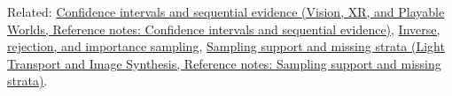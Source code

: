 Related: \href{../07-Vision-XR-and-Playable-Worlds/main.pdf\#nameddest=appendix-c83016554b1e}{Confidence intervals and sequential evidence (Vision, XR, and Playable Worlds, Reference notes: Confidence intervals and sequential evidence)}, \hyperref[appendix-8d863ed954d0]{Inverse, rejection, and importance sampling}, \href{../04-Light-Transport-and-Image-Synthesis/main.pdf\#nameddest=appendix-10308c3d753e}{Sampling support and missing strata (Light Transport and Image Synthesis, Reference notes: Sampling support and missing strata)}.
